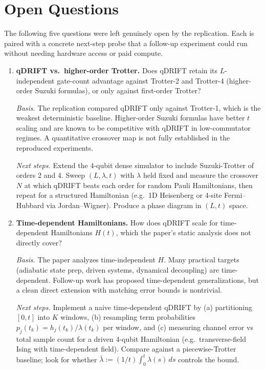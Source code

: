 \section{Open Questions}

The following five questions were left genuinely open by the replication. Each
is paired with a concrete next-step probe that a follow-up experiment could
run without needing hardware access or paid compute.

\begin{enumerate}
  \item \textbf{qDRIFT vs.\ higher-order Trotter.} Does qDRIFT retain its
    $L$-independent gate-count advantage against Trotter-2 and Trotter-4
    (higher-order Suzuki formulas), or only against first-order Trotter?

    \emph{Basis.} The replication compared qDRIFT only against Trotter-1,
    which is the weakest deterministic baseline. Higher-order Suzuki formulas
    have better $t$ scaling and are known to be competitive with qDRIFT in
    low-commutator regimes. A quantitative crossover map is not fully
    established in the reproduced experiments.

    \emph{Next steps.} Extend the 4-qubit dense simulator to include
    Suzuki-Trotter of orders 2 and 4. Sweep $(L, \lambda, t)$ with $\lambda$
    held fixed and measure the crossover $N$ at which qDRIFT beats each order
    for random Pauli Hamiltonians, then repeat for a structured Hamiltonian
    (e.g.\ 1D Heisenberg or 4-site Fermi--Hubbard via Jordan--Wigner). Produce
    a phase diagram in $(L, t)$ space.

  \item \textbf{Time-dependent Hamiltonians.} How does qDRIFT scale for
    time-dependent Hamiltonians $H(t)$, which the paper's static analysis
    does not directly cover?

    \emph{Basis.} The paper analyzes time-independent $H$. Many practical
    targets (adiabatic state prep, driven systems, dynamical decoupling) are
    time-dependent. Follow-up work has proposed time-dependent generalizations,
    but a clean direct extension with matching error bounds is nontrivial.

    \emph{Next steps.} Implement a naive time-dependent qDRIFT by
    (a) partitioning $[0, t]$ into $K$ windows, (b) resampling term
    probabilities $p_j(t_k) = h_j(t_k) / \lambda(t_k)$ per window, and
    (c) measuring channel error vs total sample count for a driven 4-qubit
    Hamiltonian (e.g.\ transverse-field Ising with time-dependent field).
    Compare against a piecewise-Trotter baseline; look for whether
    $\bar{\lambda} := (1/t) \int_0^t \lambda(s)\,ds$ controls the bound.


\end{enumerate}
